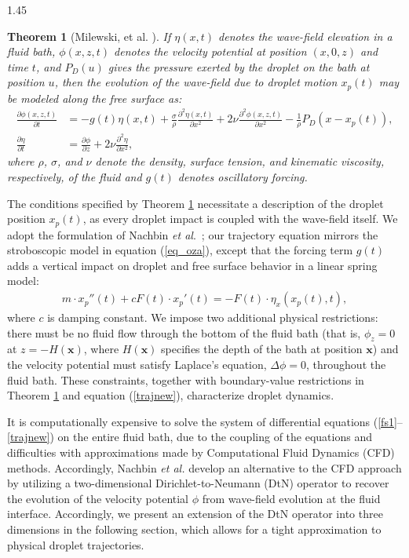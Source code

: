 \documentclass[12pt,titlepage]{article}
\newtheorem{theorem}{Theorem}[section] %
\theoremstyle{definition}
\theoremstyle{remark}
\newcommand{\ptl}{\partial}
\newcommand{\M}[1]{\mathbf{#1}}
\begin{document}
\begin{spacing}{1.45}
\begin{theorem}[Milewski, et al. \cite{milewski2015faraday}]
\label{milewski2015faraday-evolution-eta-phi}
    If $\eta(x, t)$ denotes the wave-field elevation in a fluid bath, $\phi(x, z, t)$ denotes the velocity potential at position $(x, 0, z)$ and time $t$, and $P_D(u)$ gives the pressure exerted by the droplet on the bath at position $u$, then the evolution of the wave-field due to droplet motion $x_p(t)$ may be modeled along the free surface as:
\begin{align}
\label{fs1}
    \frac{\ptl \phi(x, z, t)}{\ptl t} &= - g(t) \eta(x, t) + \frac{\sigma}{\rho} \frac{\ptl^2 \eta(x, t)}{\ptl x^2} + 2 \nu \frac{\ptl^2 \phi(x, z, t)}{\ptl x^2} - \frac{1}{\rho} P_D(x - x_p(t)), \\
\label{fs2}
    \frac{\ptl \eta}{\ptl t} &= \frac{\ptl \phi}{\ptl z} + 2 \nu \frac{\ptl^2 \eta}{\ptl x^2},
\end{align}
where $\rho$, $\sigma$, and $\nu$ denote the density, surface tension, and kinematic viscosity, respectively, of the fluid and $g(t)$ denotes oscillatory forcing.
\end{theorem}

The conditions specified by Theorem \ref{milewski2015faraday-evolution-eta-phi} necessitate a description of the droplet position $x_p(t)$, as every droplet impact is coupled with the wave-field itself. We adopt the formulation of Nachbin \textit{et al}.\ \cite{nachbin2017tunneling}; our trajectory equation mirrors the stroboscopic model in equation (\ref{eq_oza}), except that the forcing term $g(t)$ adds a vertical impact on droplet and free surface behavior in a linear spring model:
\begin{align}
\label{trajnew}
    m \cdot x_p''(t) + c F(t) \cdot x_p'(t) = -F(t) \cdot \eta_{x}(x_p(t), t),
\end{align}
where $c$ is damping constant. We impose two additional physical restrictions: there must be no fluid flow through the bottom of the fluid bath (that is,  $\phi_z = 0$ at $z = -H(\M{x})$, where $H(\M{x})$ specifies the depth of the bath at position $\M{x}$) and the velocity potential must satisfy Laplace's equation, $\Delta \phi = 0$, throughout the fluid bath. These constraints, together with boundary-value restrictions in Theorem \ref{milewski2015faraday-evolution-eta-phi} and equation (\ref{trajnew}), characterize droplet dynamics. 

It is computationally expensive to solve the system of differential equations (\ref{fs1}–\ref{trajnew}) on the entire fluid bath, due to the coupling of the equations and difficulties with approximations made by Computational Fluid Dynamics (CFD) methods. Accordingly, Nachbin \textit{et al.} \cite{nachbin2017tunneling} develop an alternative to the CFD approach by utilizing a two-dimensional Dirichlet-to-Neumann (DtN) operator to recover the evolution of the velocity potential $\phi$ from wave-field evolution at the fluid interface. Accordingly, we present an extension of the DtN operator into three dimensions in the following section, which allows for a tight approximation to physical droplet trajectories.


\end{spacing}
\end{document}
